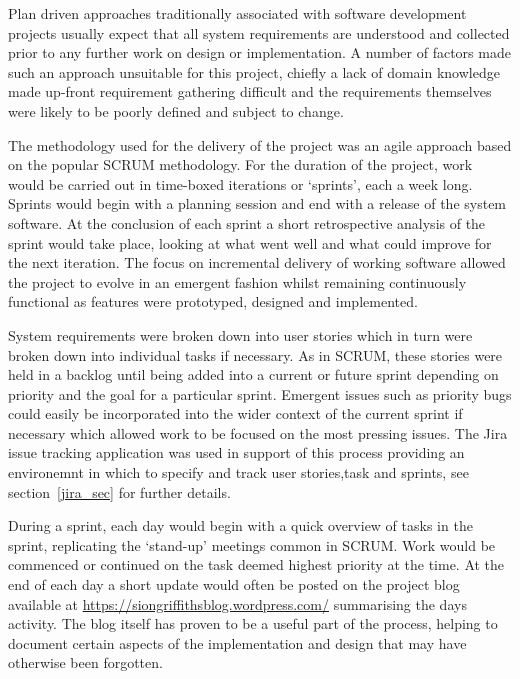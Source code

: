 Plan driven approaches traditionally associated with software development projects usually expect that all system requirements are understood and collected prior to any further work on design or implementation. A number of factors made such an approach unsuitable for this project, chiefly a lack of domain knowledge made up-front requirement gathering difficult and the requirements themselves were likely to be poorly defined and subject to change. 

The methodology used for the delivery of the project was an agile approach based on the popular SCRUM methodology. For the duration of the project, work would be carried out in time-boxed iterations or `sprints', each a week long. Sprints would begin with a planning session and end with a release of the system software. At the conclusion of each sprint a short retrospective analysis of the sprint would take place, looking at what went well and what could improve for the next iteration. The focus on incremental delivery of working software allowed the project to evolve in an emergent fashion whilst remaining continuously functional as features were prototyped, designed and implemented.  

System requirements were broken down into user stories which in turn were broken down into individual tasks if necessary. As in SCRUM, these stories were held in a backlog until being added into a current or future sprint depending on priority and the goal for a particular sprint. Emergent issues such as priority bugs could easily be incorporated into the wider context of the current sprint if necessary which allowed work to be focused on the most pressing issues. The Jira \cite{jira} issue tracking application was used in support of this process providing an environemnt in which to specify and track user stories,task and sprints, see section~\ref{jira_sec} for further details. 

During a sprint, each day would begin with a quick overview of tasks in the sprint, replicating the `stand-up' meetings common in SCRUM. Work would be commenced or continued on the task deemed highest priority at the time. At the end of each day a short update would often be posted on the project blog available at \url{https://siongriffithsblog.wordpress.com/} summarising the days activity. The blog itself has proven to be a useful part of the process, helping to document certain aspects of the implementation and design that may have otherwise been forgotten.



